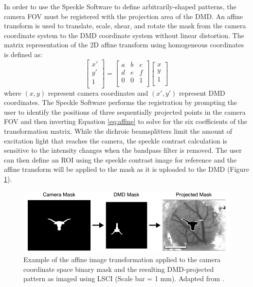 In order to use the Speckle Software to define arbitrarily-shaped patterns, the camera FOV must be registered with the projection area of the DMD. An affine transform is used to translate, scale, shear, and rotate the mask from the camera coordinate system to the DMD coordinate system without linear distortion. The matrix representation of the 2D affine transform using homogeneous coordinates is defined as:
%
\begin{equation}
    \label{eq:affine}
    \begin{bmatrix}
        x' \\
        y' \\
        1  \\
    \end{bmatrix}
    =
    \begin{bmatrix}
        a & b & c \\
        d & e & f \\
        0 & 0 & 1 \\
    \end{bmatrix}
    \begin{bmatrix}
        x \\
        y \\
        1 \\
    \end{bmatrix}
\end{equation}
%
where $(x,y)$ represent camera coordinates and $(x',y')$ represent DMD coordinates. The Speckle Software performs the registration by prompting the user to identify the positions of three sequentially projected points in the camera FOV and then inverting Equation \ref{eq:affine} to solve for the six coefficients of the transformation matrix. While the dichroic beamsplitters limit the amount of excitation light that reaches the camera, the speckle contrast calculation is sensitive to the intensity changes when the bandpass filter is removed. The user can then define an ROI using the speckle contrast image for reference and the affine transform will be applied to the mask as it is uploaded to the DMD (Figure \ref{fig:dmdregistration}).

\begin{figure}
    \includegraphics{figures/chapter_2/dmdregistration.pdf}
    \caption[Example of the affine image transformation applied to the camera coordinate space binary mask and the resulting DMD-projected pattern as imaged using LSCI.]{
        \label{fig:dmdregistration}
        Example of the affine image transformation applied to the camera coordinate space binary mask and the resulting DMD-projected pattern as imaged using LSCI (Scale bar = 1 mm). Adapted from \cite{Sullender:2018ff}.
    }
\end{figure}


